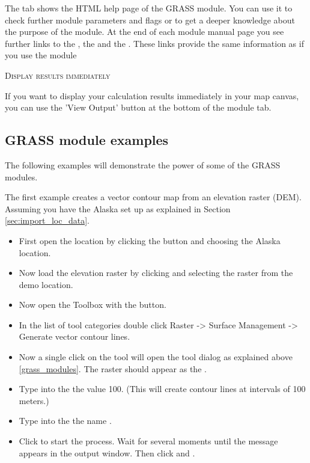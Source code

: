 
The  tab shows the HTML help page of the GRASS module. You can 
use it to check further module parameters and flags or to get a deeper 
knowledge about the purpose of the module. At the end of each module 
manual page you see further links to the , the 
 and the . These links provide 
the same information as if you use the module  

\begin{Tip}\caption{\textsc{Display results immediately}}
If you want to display your calculation results immediately in your 
map canvas, you can use the 'View Output' button at the bottom of the 
module tab.
\end{Tip} 

\subsection{GRASS module examples}
The following examples will demonstrate the power of some of the GRASS modules. 


The first example creates a vector contour map from an elevation raster
(DEM). Assuming you have the Alaska  set up as explained
in Section \ref{sec:import_loc_data}. 

\begin{itemize}[label=--]
\item First open the location by clicking the
 button and choosing the Alaska
location. 
\item Now load the  elevation raster by clicking
 and selecting the
 raster from the demo location.
\item Now open the Toolbox with the  button. 
\item In the list of tool categories double click Raster -> Surface
Management -> Generate vector contour lines. 
\item Now a single click on the tool  will open
the tool dialog as explained above \ref{grass_modules}. The
 raster should appear as the . 
\item Type into the  the
value 100. (This will create contour lines at intervals of
100 meters.)
\item Type into the 
the name . 
\item Click  to start the process. Wait for several moments until
the message  appears in the output window.
Then click  and . 
\end{itemize}

